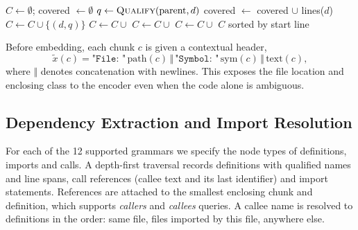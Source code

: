 \documentclass[conference]{IEEEtran}
\begin{document}
\begin{algorithm}[t]
\caption{Syntax-aware chunking of a scope}\label{alg:chunk}
\begin{algorithmic}[1]
  \State $C \gets \emptyset$; covered $\gets \emptyset$
    \State $q \gets \textsc{Qualify}(\text{parent}, d)$
    \State covered $\gets$ covered $\cup$ lines($d$)
      \State $C \gets C \cup \{(d, q)\}$
      \State $C \gets C \cup$ 
    \Else
      \State $C \gets C \cup$ 
    \EndIf
  \EndFor
    \State $C \gets C \cup$ 
  \EndFor
  \State \Return $C$ sorted by start line
\EndFunction
\end{algorithmic}
\end{algorithm}

Before embedding, each chunk $c$ is given a contextual header,
\begin{equation}
  \tilde{x}(c) = \texttt{"File: "}\,\text{path}(c)\,\Vert\,\texttt{"Symbol: "}\,\text{sym}(c)\,\Vert\,\text{text}(c),
\end{equation}
where $\Vert$ denotes concatenation with newlines. This exposes the file
location and enclosing class to the encoder even when the code alone is
ambiguous.

\subsection{Dependency Extraction and Import Resolution}\label{sec:deps}
For each of the 12 supported grammars we specify the node types of
definitions, imports and calls. A depth-first traversal records definitions
with qualified names and line spans, call references (callee text and its last
identifier) and import statements. References are attached to the smallest
enclosing chunk and definition, which supports \emph{callers} and
\emph{callees} queries. A callee name is resolved to definitions in the order:
same file, files imported by this file, anywhere else.
\end{document}
